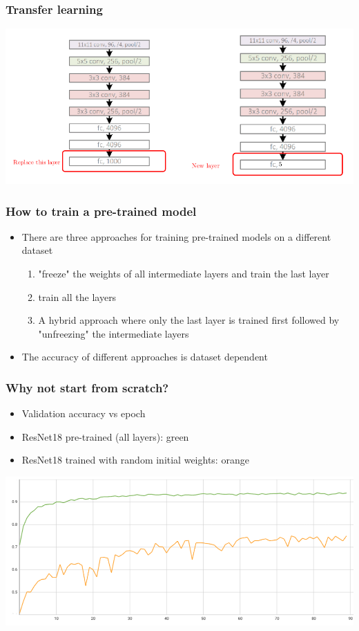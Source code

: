 \documentclass{beamer}
\begin{document}
\begin{frame}
    \frametitle{Transfer learning}
\begin{center}
    \includegraphics[width=\textwidth]{figs/transfer-fig4.png}
\end{center}
\end{frame}

\begin{frame}
    \frametitle{How to train a pre-trained model}
\begin{itemize}
    \item There are three approaches for training pre-trained models on a different dataset
    \begin{enumerate}
        \item "freeze" the weights of all intermediate layers and train the last layer
        \item train all the layers
        \item A hybrid approach where only the last layer is trained first followed by "unfreezing" the intermediate  layers
    \end{enumerate}
    \item The accuracy of different approaches is dataset dependent
\end{itemize}
    

\end{frame}

\begin{frame}
    \frametitle{Why not start from scratch?}
    \begin{itemize}
        \item Validation accuracy vs epoch
        \item ResNet18 pre-trained (all layers): green
        \item ResNet18 trained with random initial weights: orange
    \end{itemize}
\begin{center}
    \includegraphics[width=\textwidth]{figs/pre-vs-scratch.png}
\end{center}
\end{frame}
\end{document}
